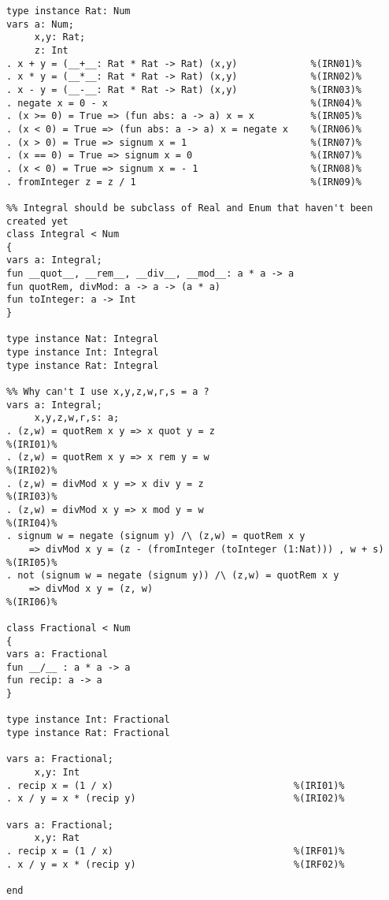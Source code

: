 \begin{Verbatim}
type instance Rat: Num
vars a: Num;
     x,y: Rat;
     z: Int
. x + y = (__+__: Rat * Rat -> Rat) (x,y)             %(IRN01)%
. x * y = (__*__: Rat * Rat -> Rat) (x,y)             %(IRN02)%
. x - y = (__-__: Rat * Rat -> Rat) (x,y)             %(IRN03)%
. negate x = 0 - x                                    %(IRN04)%
. (x >= 0) = True => (fun abs: a -> a) x = x          %(IRN05)%
. (x < 0) = True => (fun abs: a -> a) x = negate x    %(IRN06)%
. (x > 0) = True => signum x = 1                      %(IRN07)%
. (x == 0) = True => signum x = 0                     %(IRN07)%
. (x < 0) = True => signum x = - 1                    %(IRN08)%
. fromInteger z = z / 1                               %(IRN09)%

%% Integral should be subclass of Real and Enum that haven't been created yet
class Integral < Num
{
vars a: Integral;
fun __quot__, __rem__, __div__, __mod__: a * a -> a
fun quotRem, divMod: a -> a -> (a * a)
fun toInteger: a -> Int
}

type instance Nat: Integral
type instance Int: Integral
type instance Rat: Integral

%% Why can't I use x,y,z,w,r,s = a ?
vars a: Integral;
     x,y,z,w,r,s: a;
. (z,w) = quotRem x y => x quot y = z                                 %(IRI01)%
. (z,w) = quotRem x y => x rem y = w                                  %(IRI02)%
. (z,w) = divMod x y => x div y = z                                   %(IRI03)%
. (z,w) = divMod x y => x mod y = w                                   %(IRI04)%
. signum w = negate (signum y) /\ (z,w) = quotRem x y
    => divMod x y = (z - (fromInteger (toInteger (1:Nat))) , w + s)   %(IRI05)%
. not (signum w = negate (signum y)) /\ (z,w) = quotRem x y 
    => divMod x y = (z, w)                                            %(IRI06)%

class Fractional < Num
{
vars a: Fractional
fun __/__ : a * a -> a
fun recip: a -> a
}

type instance Int: Fractional
type instance Rat: Fractional

vars a: Fractional;
     x,y: Int
. recip x = (1 / x)                                %(IRI01)%
. x / y = x * (recip y)                            %(IRI02)%

vars a: Fractional;
     x,y: Rat
. recip x = (1 / x)                                %(IRF01)%
. x / y = x * (recip y)                            %(IRF02)%

end
\end{Verbatim}

